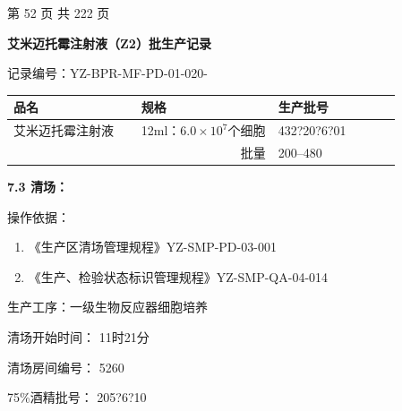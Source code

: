 \documentclass[UTF8,10pt,a4paper,fontset=fandol]{ctexart}
\newcommand{\fieldvalue}[1]{#1}
\newcommand{\handwritten}[1]{#1}
\begin{document}
\vfill

\begin{center}
第 52 页 共 222 页
\end{center}

\newpage

\begin{center}
\textbf{艾米迈托霉注射液（Z2）批生产记录}
\end{center}

\noindent
记录编号：YZ-BPR-MF-PD-01-020-\underline{\hspace{1.5cm}}

\begin{center}
\begin{tabular}{|p{0.29\linewidth}|p{0.30\linewidth}|p{0.27\linewidth}|}
\hline
\centering 品名 & \centering 规格 & \centering 生产批号 \tabularnewline
\hline
艾米迈托霉注射液 & 12ml：$6.0\times10^{7}$个细胞 &
\fieldvalue{\handwritten{432?20?6?01}} \tabularnewline
\hline
\multicolumn{2}{|r|}{批量} &
200--480 \tabularnewline
\hline
\end{tabular}
\end{center}

\noindent\textbf{7.3 清场：}

\medskip
\noindent 操作依据：

\begin{enumerate}
\item 《生产区清场管理规程》\hfill YZ-SMP-PD-03-001
\item 《生产、检验状态标识管理规程》\hfill YZ-SMP-QA-04-014
\end{enumerate}

\noindent
生产工序：一级生物反应器细胞培养

\noindent
清场开始时间：
\fieldvalue{\handwritten{11}}时\fieldvalue{\handwritten{21}}分

\noindent
清场房间编号：
\fieldvalue{\handwritten{5260}}

\hfill 75\%酒精批号：
\fieldvalue{\handwritten{205?6?10}}
\end{document}
